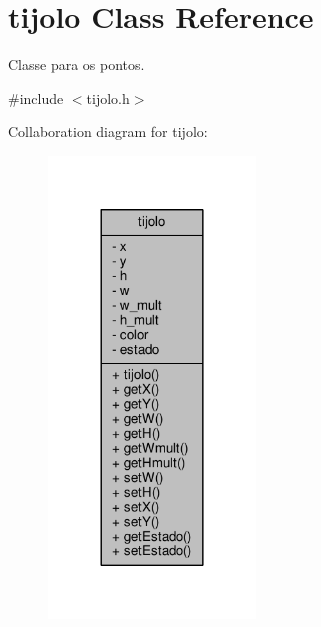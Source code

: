 \hypertarget{classtijolo}{}\section{tijolo Class Reference}
\label{classtijolo}


Classe para os pontos.  




{\ttfamily \#include $<$tijolo.\+h$>$}



Collaboration diagram for tijolo\+:\nopagebreak
\begin{figure}[H]
\begin{center}
\leavevmode
\includegraphics[width=156pt]{classtijolo__coll__graph}
\end{center}
\end{figure}
